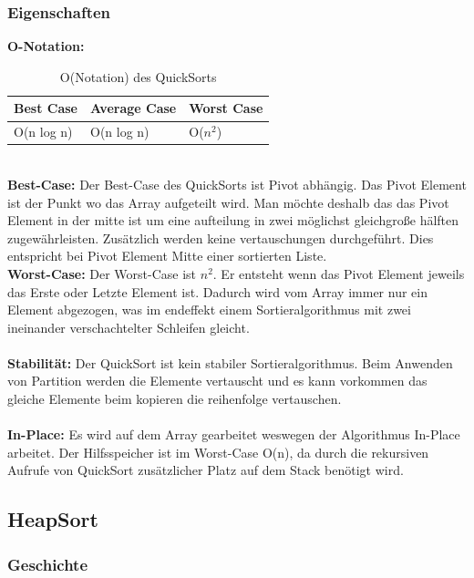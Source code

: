 \documentclass{article}
\begin{document}
\subsubsection{Eigenschaften}
\textbf{O-Notation:}
\begin{table}[h]
\centering
\begin{tabular}{lll}
	\hline
	\textbf{Best Case} & \textbf{Average Case} & \textbf{Worst Case} \\
	\hline
	O(n log n) & O(n log n) & O($n^{2}$) \\
	\hline
\end{tabular}
\caption{O(Notation) des QuickSorts \cite{India2015Dataset}}
\label{tab:QuickSort}
\end{table}
\\
\textbf{Best-Case:} Der Best-Case des QuickSorts ist Pivot abhängig. Das Pivot Element ist der Punkt wo das Array aufgeteilt wird. Man möchte deshalb das das Pivot Element in der mitte ist um eine aufteilung in zwei möglichst gleichgroße hälften zugewährleisten. Zusätzlich werden keine vertauschungen durchgeführt. Dies entspricht bei Pivot Element Mitte einer sortierten Liste.\\
\textbf{Worst-Case:} Der Worst-Case ist  $n^{2}$. Er entsteht wenn das Pivot Element jeweils das Erste oder Letzte Element ist. Dadurch wird vom Array immer nur ein Element abgezogen, was im endeffekt einem Sortieralgorithmus mit zwei ineinander verschachtelter Schleifen gleicht.\\ \\
\textbf{Stabilität:} Der QuickSort ist kein stabiler Sortieralgorithmus. Beim Anwenden von Partition werden die Elemente vertauscht und es kann vorkommen das gleiche Elemente beim kopieren die reihenfolge vertauschen. \\
\\
\textbf{In-Place:} Es wird auf dem Array gearbeitet weswegen der Algorithmus In-Place arbeitet. Der Hilfsspeicher ist im Worst-Case O(n), da durch die rekursiven Aufrufe von QuickSort zusätzlicher Platz auf dem Stack benötigt wird.\cite{sedgewick1978pivot}  \\
\subsection{HeapSort}
\subsubsection*{Geschichte}
\end{document}
